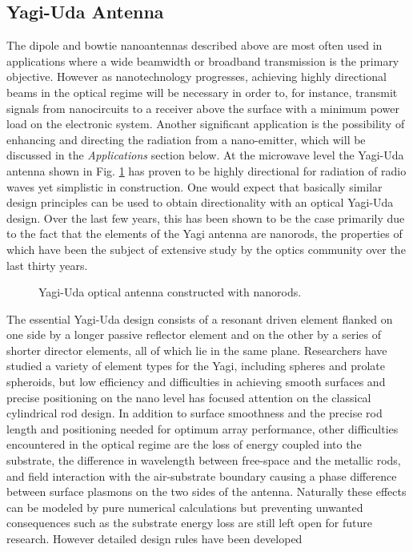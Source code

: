 \subsection{Yagi-Uda Antenna}
%
The dipole and bowtie nanoantennas described above are most often used in applications where a wide beamwidth or broadband transmission is the primary objective. However as nanotechnology progresses, achieving highly directional beams in the optical regime will be necessary in order to, for instance, transmit signals from nanocircuits to a receiver above the surface with a minimum power load on the electronic system. Another significant application is the possibility of enhancing and directing the radiation from a nano-emitter, which will be discussed in the \emph{Applications} section below. At the microwave level the Yagi-Uda antenna shown in Fig. \ref{fig:yagi_uda} has proven to be highly directional for radiation of radio waves yet simplistic in construction. One would expect that basically similar design principles can be used to obtain directionality with an optical Yagi-Uda design. Over the last few years, this has been shown to be the case primarily due to the fact that the elements of the Yagi antenna are nanorods, the properties of which have been the subject of extensive study by the optics community over the last thirty years.
%
%
\begin{figure}[h!]
  \centering
  \def\svgwidth{.75\linewidth}
  
  \caption{Yagi-Uda optical antenna constructed with nanorods.}
  \label{fig:yagi_uda}
\end{figure}
%
%
The essential Yagi-Uda design consists of a resonant driven element flanked on one side by a longer passive reflector element and on the other by a series of shorter director elements, all of which lie in the same plane. Researchers have studied a variety of element types for the Yagi, including spheres and prolate spheroids, but low efficiency and difficulties in achieving smooth surfaces and precise positioning on the nano level has focused attention on the classical cylindrical rod design. In addition to surface smoothness and the precise rod length and positioning needed for optimum array performance, other difficulties encountered in the optical regime are the loss of energy coupled into the substrate, the difference in wavelength between free-space and the metallic rods, and field interaction with the air-substrate boundary causing a phase difference between surface plasmons on the two sides of the antenna. Naturally these effects can be modeled by pure numerical calculations but preventing unwanted consequences such as the substrate energy loss are still left open for future research. However detailed design rules have been developed
